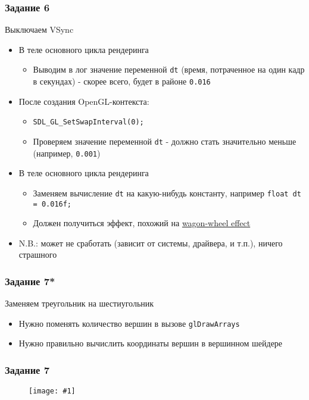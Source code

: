 \documentclass{beamer}
\newcommand{\slideimage}[1]{
  \begin{figure}
    \begin{adjustbox}{width=\textwidth, totalheight=\textheight-2\baselineskip-2\baselineskip,keepaspectratio}
      \texttt{[image: \#1]}
    \end{adjustbox}
  \end{figure}
}
\begin{document}
\begin{frame}[fragile]
\frametitle{Задание 6}
Выключаем VSync
\begin{itemize}
\item В теле основного цикла рендеринга
\begin{itemize}
\item Выводим в лог значение переменной \verb|dt| (время, потраченное на один кадр в секундах) - скорее всего, будет в районе \verb|0.016|
\end{itemize}
\item После создания OpenGL-контекста:
\begin{itemize}
\item \verb|SDL_GL_SetSwapInterval(0);|
\item Проверяем значение переменной \verb|dt| - должно стать значительно меньше (например, \verb|0.001|)
\end{itemize}
\item В теле основного цикла рендеринга
\begin{itemize}
\item Заменяем вычисление \verb|dt| на какую-нибудь константу, например \verb|float dt = 0.016f;|
\item Должен получиться эффект, похожий на \href{https://en.wikipedia.org/wiki/Wagon-wheel_effect}{wagon-wheel effect}
\end{itemize}
\item N.B.: может не сработать (зависит от системы, драйвера, и т.п.), ничего страшного
\end{itemize}
\end{frame}

\begin{frame}[fragile]
\frametitle{Задание 7*}
Заменяем треугольник на шестиугольник
\begin{itemize}
\item Нужно поменять количество вершин в вызове \verb|glDrawArrays|
\item Нужно правильно вычислить координаты вершин в вершинном шейдере
\end{itemize}
\end{frame}

\begin{frame}
\frametitle{Задание 7}
\slideimage{7.png}
\end{frame}
\end{document}
